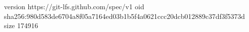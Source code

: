 version https://git-lfs.github.com/spec/v1
oid sha256:980d583de6704a8f05a7164ed03b1b5f4a0621ccc20dcb012889c37df3f5373d
size 174916
